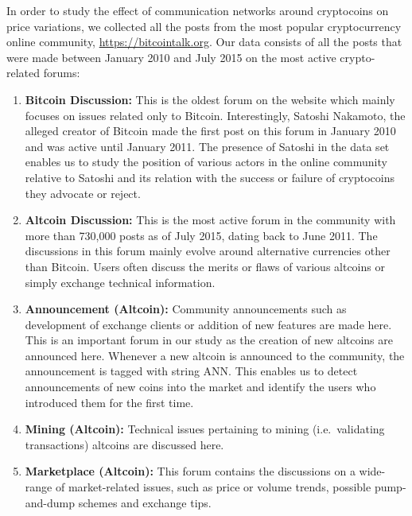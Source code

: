 In order to study the effect of communication networks around cryptocoins on
price variations, we collected all the posts from the most popular cryptocurrency
online community, \url{https://bitcointalk.org}.  Our data consists of all the posts that were
made between January 2010 and July 2015 on the most active crypto-related forums:
\begin{enumerate}[topsep=0pt,itemsep=-0.5ex,partopsep=1ex,parsep=1ex]
  \item \textbf{Bitcoin Discussion:} This is the oldest forum on the website which mainly focuses
    on issues related only to Bitcoin. Interestingly, Satoshi Nakamoto, the alleged
    creator of Bitcoin made the first post on this forum in January 2010 and
    was active until January 2011. The presence of Satoshi in the data set enables us
    to study the position of various actors in the online community relative to Satoshi
    and its relation with the success or failure of cryptocoins they advocate or reject.
  \item \textbf{Altcoin Discussion:} This is the most active forum in the community
    with more than 730,000 posts as of July 2015, dating back to June 2011.
    The discussions in this forum mainly evolve around alternative currencies
    other than Bitcoin. Users often discuss the merits or flaws of various
    altcoins or simply exchange technical information.
  \item \textbf{Announcement (Altcoin):} Community announcements such as development of 
    exchange clients or addition of new features are made here. This is an important forum
    in our study as the creation of new altcoins are announced here. Whenever a new
    altcoin is announced to the community, the announcement is tagged with string ANN.
    This enables us to detect announcements of new coins into the market and identify
    the users who introduced them for the first time.
  \item \textbf{Mining (Altcoin):} Technical issues pertaining to mining (i.e.~validating transactions)
    altcoins are discussed here.
  \item \textbf{Marketplace (Altcoin):} This forum contains the discussions on a wide-range of 
    market-related issues, such as price or volume trends, possible pump-and-dump schemes
    and exchange tips.
\end{enumerate}

